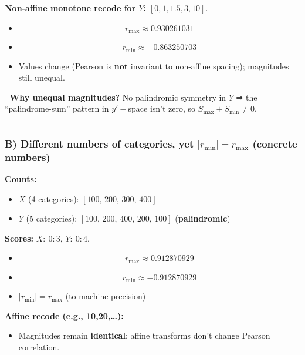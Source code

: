 \documentclass[
  letterpaper,
  DIV=11,
  numbers=noendperiod]{scrartcl}
\providecommand{\tightlist}{%
  \setlength{\itemsep}{0pt}\setlength{\parskip}{0pt}}
\theoremstyle{remark}
\begin{document}
\textbf{Non-affine monotone recode for \(Y\):} \([0,1,1.5,3,10]\).

\begin{itemize}
\item
  \[r_{\max}\approx 0.930261031\]
\item
  \[r_{\min}\approx -0.863250703\]
\item
  Values change (Pearson is \textbf{not} invariant to non-affine
  spacing); magnitudes still unequal.
\end{itemize}

🧠 \textbf{Why unequal magnitudes?} No palindromic symmetry in \(Y\) ⇒
the ``palindrome-sum'' pattern in \(y'-\)space isn't zero, so
\(S_{\max}+S_{\min}\ne 0\).

\begin{center}\rule{0.5\linewidth}{0.5pt}\end{center}

\subsubsection{\texorpdfstring{B) \textbf{Different numbers of
categories, yet \(|r_{\min}|=r_{\max}\)} (concrete
numbers)}{B) Different numbers of categories, yet \textbar r\_\{\textbackslash min\}\textbar=r\_\{\textbackslash max\} (concrete numbers)}}\label{b-different-numbers-of-categories-yet-r_minr_max-concrete-numbers}

\textbf{Counts:}

\begin{itemize}
\item
  \(X\) (4 categories): \([100,\,200,\,300,\,400]\)
\item
  \(Y\) (5 categories): \([100,\,200,\,400,\,200,\,100]\)
  (\textbf{palindromic})
\end{itemize}

\textbf{Scores:} \(X:\ 0{:}3\), \(Y:\ 0{:}4\).

\begin{itemize}
\item
  \[r_{\max}\approx 0.912870929\]
\item
  \[r_{\min}\approx -0.912870929\]
\item
  \(|r_{\min}| = r_{\max}\) (to machine precision)
\end{itemize}

\textbf{Affine recode (e.g., 10,20,\ldots):}

\begin{itemize}
\tightlist
\item
  Magnitudes remain \textbf{identical}; affine transforms don't change
  Pearson correlation.
\end{itemize}
\end{document}
